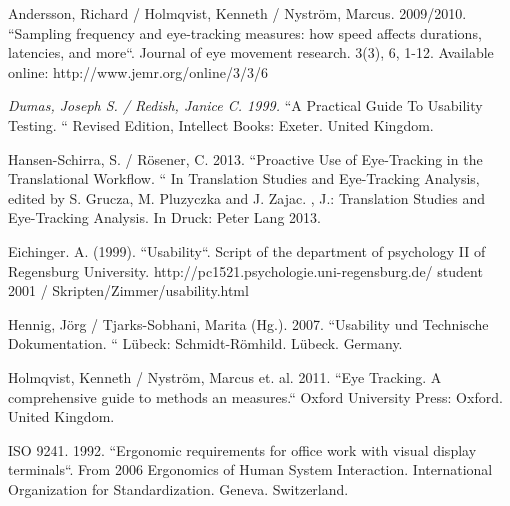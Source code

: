 \begin{
}[h]
\begin{styleBibliography}
Andersson, Richard / Holmqvist, Kenneth / Nyström, Marcus. 2009/2010. “Sampling frequency and eye-tracking measures: how speed affects durations, latencies, and more“. Journal of eye movement research. 3(3), 6, 1-12. Available online: http://www.jemr.org/online/3/3/6
\end{styleBibliography}

\begin{styleBibliography}
\emph{Dumas, Joseph S. / Redish, Janice C. 1999. }“A Practical Guide To Usability Testing. “ Revised Edition, Intellect Books: Exeter. United Kingdom.
\end{styleBibliography}

\begin{styleBibliography}
Hansen-Schirra, S. / Rösener, C. 2013. “Proactive Use of Eye-Tracking in the Translational Workflow. “ In Translation Studies and Eye-Tracking Analysis, edited by S. Grucza, M. Pluzyczka and J. Zajac. , J.: Translation Studies and Eye-Tracking Analysis. In Druck: Peter Lang 2013.
\end{styleBibliography}

\begin{styleBibliography}
Eichinger. A. (1999). “Usability“. Script of the department of psychology II of Regensburg University. http://pc1521.psychologie.uni-regensburg.de/ student 2001 / Skripten/Zimmer/usability.html
\end{styleBibliography}

\begin{styleBibliography}
Hennig, Jörg / Tjarks-Sobhani, Marita (Hg.). 2007. “Usability und Technische Dokumentation. “ Lübeck: Schmidt-Römhild. Lübeck. Germany.
\end{styleBibliography}

\begin{styleBibliography}
Holmqvist, Kenneth / Nyström, Marcus et. al. 2011. “Eye Tracking. A comprehensive guide to methods an measures.“ Oxford University Press: Oxford. United Kingdom.
\end{styleBibliography}

\begin{styleBibliography}
ISO 9241. 1992. “Ergonomic requirements for office work with visual display terminals“. From 2006 {\textquotedbl}Ergonomics of Human System Interaction{\textquotedbl}. International Organization for Standardization. Geneva. Switzerland.
\end{styleBibliography}


\end{
}
